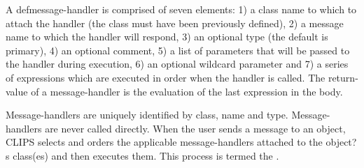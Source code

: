 \documentclass[letterpaper,10pt,english]{sphinxmanual}
\begin{document}
A defmessage-handler is comprised of seven elements: 1) a class name to
which to attach the handler (the class must have been previously
defined), 2) a message name to which the handler will respond, 3) an
optional type (the default is primary), 4) an optional comment, 5) a
list of parameters that will be passed to the handler during execution,
6) an optional wildcard parameter and 7) a series of expressions which
are executed in order when the handler is called. The return-value of a
message-handler is the evaluation of the last expression in the body.


\begin{sphinxVerbatim}[commandchars=\\\{\}]
   

  
  \PYG{p}{[}\PYG{p}{]} \PYG{p}{[}\PYG{p}{]}
   \PYG{p}{[}\PYG{p}{]}

        

  

  
\end{sphinxVerbatim}

Message-handlers are uniquely identified by class, name and type.
Message-handlers are never called directly. When the user sends a
message to an object, CLIPS selects and orders the applicable
message-handlers attached to the object?s class(es) and then executes
them. This process is termed the .
\end{document}
